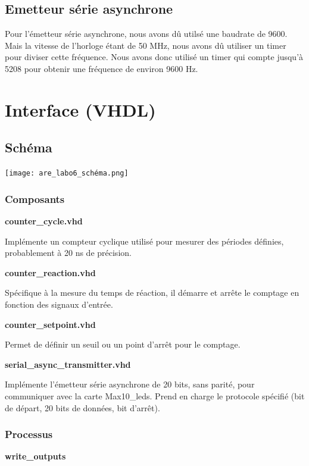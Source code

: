 \documentclass[a4paper,12pt]{article}
\begin{document}
\subsection{Emetteur série asynchrone}

Pour l'émetteur série asynchrone, nous avons dû utilsé une baudrate de 9600. Mais la vitesse de l'horloge étant de 50 MHz, nous avons dû utiliser un timer pour diviser cette fréquence. Nous avons donc utilisé un timer qui compte jusqu'à 5208 pour obtenir une fréquence de environ 9600 Hz.

\break

\section{Interface (VHDL)}

\subsection{Schéma}

\texttt{[image: are\_labo6\_schéma.png]}

\break

\subsubsection{Composants}

\textbf{counter\_cycle.vhd}

Implémente un compteur cyclique utilisé pour mesurer des périodes définies, probablement à 20 ns de précision.

\textbf{counter\_reaction.vhd}

Spécifique à la mesure du temps de réaction, il démarre et arrête le comptage en fonction des signaux d’entrée.

\textbf{counter\_setpoint.vhd}

Permet de définir un seuil ou un point d'arrêt pour le comptage.

\textbf{serial\_async\_transmitter.vhd}

Implémente l'émetteur série asynchrone de 20 bits, sans parité, pour communiquer avec la carte Max10\_leds.
Prend en charge le protocole spécifié (bit de départ, 20 bits de données, bit d'arrêt).

\subsubsection{Processus}

\textbf{write\_outputs}
\end{document}
